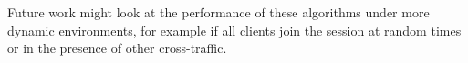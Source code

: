 \documentclass[10pt,sigconf,anonymous]{acmart}
\begin{document}
Future work might look at the performance of these algorithms under more dynamic environments, for example if all clients join the session at random times or in the presence of other cross-traffic. 



%





\ifpdf
  \ifdefined\pdftrailerid
    \pdftrailerid{}
  \fi
\fi


\end{document}
